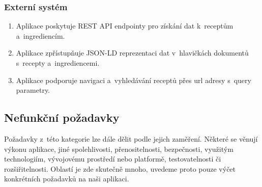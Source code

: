 \subsubsection{Externí systém}

\begin{enumerate}
    \item Aplikace poskytuje REST API endpointy pro získání dat k~receptům a~ingrediencím.
    \item Aplikace zpřístupňuje JSON-LD reprezentaci dat v~hlavičkách dokumentů s~recepty a~ingrediencemi.
    \item Aplikace podporuje navigaci a~vyhledávání receptů přes url adresy s~query parametry.
\end{enumerate}

\subsection{Nefunkční požadavky}

Požadavky z~této kategorie lze dále dělit podle jejich zaměření. Některé se věnují výkonu aplikace, jiné spolehlivosti, přenositelnosti, bezpečnosti, využitým technologiím, vývojovému prostředí nebo platformě, testovatelnosti či rozšiřitelnosti. Oblastí je zde skutečně mnoho, uvedeme proto pouze výčet konkrétních požadavků na naši aplikaci.

